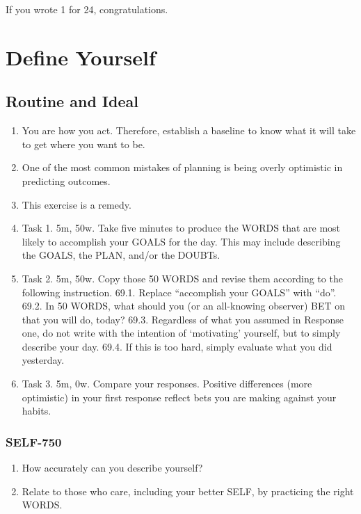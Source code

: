 \documentclass[
]{book}
\providecommand{\tightlist}{%
  \setlength{\itemsep}{0pt}\setlength{\parskip}{0pt}}
\begin{document}
If you wrote 1 for 24, congratulations.

\hypertarget{define-yourself}{%
\chapter{Define Yourself}\label{define-yourself}}

\hypertarget{routine-and-ideal}{%
\section{Routine and Ideal}\label{routine-and-ideal}}

\begin{enumerate}
\def\labelenumi{\arabic{enumi}.}
\setcounter{enumi}{64}
\item
  You are how you act. Therefore, establish a baseline to know what it will take to
  get where you want to be.
\item
  One of the most common mistakes of planning is being overly optimistic in
  predicting outcomes.
\item
  This exercise is a remedy.
\item
  Task 1. 5m, 50w. Take five minutes to produce the WORDS that are most likely
  to accomplish your GOALS for the day. This may include describing the GOALS,
  the PLAN, and/or the DOUBTs.
\item
  Task 2. 5m, 50w. Copy those 50 WORDS and revise them according to the
  following instruction.
  69.1. Replace ``accomplish your GOALS'' with ``do''.
  69.2. In 50 WORDS, what should you (or an all-knowing observer) BET on that
  you will do, today?
  69.3. Regardless of what you assumed in Response one, do not write with the
  intention of `motivating' yourself, but to simply describe your day.
  69.4. If this is too hard, simply evaluate what you did yesterday.
\item
  Task 3. 5m, 0w. Compare your responses. Positive differences (more optimistic)
  in your first response reflect bets you are making against your habits.
\end{enumerate}

\hypertarget{self-750}{%
\subsection{SELF-750}\label{self-750}}

\begin{enumerate}
\def\labelenumi{\arabic{enumi}.}
\setcounter{enumi}{70}
\tightlist
\item
  How accurately can you describe yourself?
\item
  Relate to those who care, including your better SELF, by practicing the right
  WORDS.
\end{enumerate}
\end{document}

